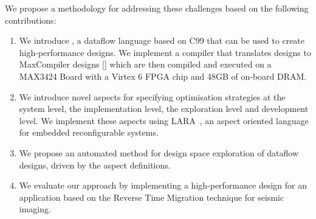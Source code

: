 We propose a methodology for addressing these challenges based on the
following contributions:
\begin{enumerate}
\item We introduce \MAXC{}, a dataflow language based on C99 that can
  be used to create high-performance designs. We implement a compiler
  that translates \MAXC{} designs to MaxCompiler designs [] which are then compiled and executed on a MAX3424
    Board with a Virtex 6 FPGA chip and 48GB of on-board DRAM.
\item We introduce novel aspects for specifying optimisation
  strategies at the system level, the implementation level, the
  exploration level and development level. We implement these aspects
  using
  LARA~\cite{Cardoso:Carvalho:Cutinho:Luk:Nobre:Diniz:Petrov:2012}, an
  aspect oriented language for embedded reconfigurable systems.
\item We propose an automated method for design space exploration of
  \MAXC{} dataflow designs, driven by the aspect definitions.
\item We evaluate our approach by implementing a high-performance
  design for an application based on the Reverse Time Migration
  technique for seismic imaging.
\end{enumerate}
